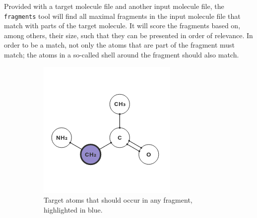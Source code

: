 Provided with a target molecule file and another input molecule file, the \verb|fragments| tool will find all maximal fragments in the input molecule file that match with parts of the target molecule. It will score the fragments based on, among others, their size, such that they can be presented in order of relevance. In order to be a match, not only the atoms that are part of the fragment must match; the atoms in a so-called shell around the fragment should also match.

\clearpage

\begin{figure}
\centering
\begin{subfigure}[t]{0.29\textwidth}
\centering
\includegraphics[width=\textwidth]{img/shell_1.png}
\caption{Target atoms that should occur in any fragment, highlighted in blue.}
\end{subfigure}%
\qquad
\begin{subfigure}[t]{0.29\textwidth}
\centering

\end{subfigure}
\end{figure}
